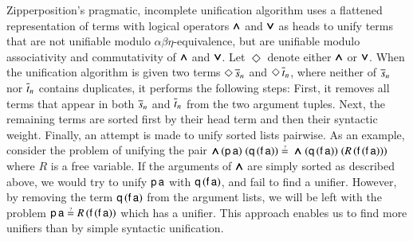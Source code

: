 Zipperposition's pragmatic, incomplete unification algorithm 
uses a flattened representation of terms with logical operators $\pmb{\land}$ and $\pmb{\lor}$
as heads to unify terms that are not unifiable modulo $\alpha\beta\eta$-equivalence, but
are unifiable modulo associativity and commutativity of $\pmb{\land}$ and $\pmb{\lor}$. Let
$\Diamond$ denote either $\pmb{\land}$ or $\pmb{\lor}$. When the unification algorithm is given
two terms $\Diamond \, \overline{s}_{n}$ and $\Diamond \, \overline{t}_{n}$, where neither
of $\overline{s}_{n}$ nor $\overline{t}_{n}$ contains duplicates, it performs the
following steps: First, it removes all terms that appear in both
$\overline{s}_{n}$ and $\overline{t}_{n}$ from the two argument tuples.
Next, the remaining terms are sorted first by their head term and then their syntactic weight. Finally,
an attempt is made to unify sorted lists pairwise.
%
As an example, consider the problem of unifying the pair ${\iand} \,
(\cst{p} \, \cst{a}) \; (\cst{q} \, (\cst{f} \, \cst{a})) \unif \; {\iand} \;
(\cst{q} \, (\cst{f} \, \cst{a})) \; (R \, (\cst{f} \, (\cst{f} \,
\cst{a})))$ where $R$ is a free variable. If the arguments of $\pmb{\land}$ are
simply sorted as described above, we would try to unify $\mathsf{p} \, \mathsf{a}$
with $\mathsf{q} \, (\mathsf{f} \, \mathsf{a})$, and fail to find a unifier. However, by
removing the term  $\mathsf{q} \, (\mathsf{f} \, \mathsf{a})$ from the argument lists, we
will be left with the problem $\cst{p} \, \cst{a} \unif  R \, (\cst{f} \, (\cst{f}
\, \cst{a}))$ which has a unifier. This approach enables us to find more unifiers
than by simple syntactic unification.

